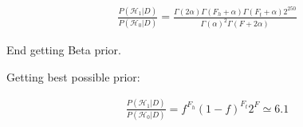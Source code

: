 \documentclass[12pt]{article}
\begin{document}
\begin{gather}
\frac{P(\mathcal{H}_1 | D)}{P(\mathcal{H}_0 | D)} =
\frac{\Gamma(2\alpha)\Gamma(F_h+\alpha)\Gamma(F_t+\alpha)2^{250}}
{\Gamma(\alpha)^2\Gamma(F+2\alpha)}
\end{gather}

End getting Beta prior.
 
Getting best possible prior:
 
\begin{gather}
 \frac{P(\mathcal{H}_1 | D)}{P(\mathcal{H}_0 | D)} =
 f^{F_h}(1-f)^{F_t}2^F \simeq 6.1
\end{gather}
\end{document}
